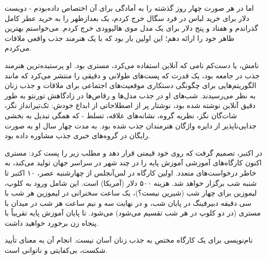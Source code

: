 اما در هر صورت چهار روز گذشته را به آمادگی برای آن اختصاص داده‌بودم - دویست دلار برای خرید لباس در فرد سگال خرج کردم، یک بعدازظهر را به خرید عطر کامل گذراندم و هفتاد و پنج دلار برای یک مدل موی هالیوودی خرج کردم. می‌خواستم بهترین ظاهر خود را ارائه دهم؛ این اولین بار بود که با یک هنرمند جذب واقعی ملاقات می‌کردم.

نامش، یا دست‌کم نامی که آنلاین استفاده می‌کرد، مستری بود. او پرستیده‌ترین هنرمند جذب در جامعه بود، یک قدرت که پست‌های طولانی و دقیقی را منتشر می‌کرد که مانند الگوریتم‌هایی برای چگونگی دستکاری موقعیت‌های اجتماعی برای ملاقات و جذب زنان به نظر می‌رسیدند. شب‌های او در جذب مدل‌ها و رقاص‌ها در زادگاهش تورنتو به طور دقیق آنلاین نوشته شده بود، نوشتار پر از اصطلاحاتی از ابداع خودش: تک‌تیرانداز نگز، شات‌گان نگز، نظریه گروه، نشانه‌های علاقه، تسلط - که همگی تبدیل به بخشی جدایی‌ناپذیر از دایره واژگان هنرمندان جذب شده بود. به مدت چهار سال او به صورت رایگان در گروه‌های خبری جذب مشاوره داده بود.

در اکتبر، تصمیم گرفت که روی خود قیمتی قرار دهد و مطلب زیر را پست کرد:
مستری اکنون کارگاه‌های آموزشی آموزش پایه را در چند شهر در سراسر جهان تولید می‌کند، به خاطر درخواست‌های متعدد. اولین کارگاه در لس‌آنجلس از چهارشنبه عصر، ۱۰ اکتبر تا شنبه شب برگزار خواهد شد. هزینه ۵۰۰ دلار (آمریکا) است. این شامل ورود به کلوپ، لیموزین برای چهار شب (شیرین نیست؟)، یک ساعت سخنرانی در لیموزین هر شب با سی دقیقه دبیرفینگ در پایان شب، و در نهایت سه و نیم ساعت هر شب در میدان با مستری (در دو کلوپ در هر شب تقسیم می‌شود) می‌شود. تا پایان آموزش پایه تقریباً با پنجاه زن برخورد خواهید داشت.

نام‌نویسی برای یک کارگاه مختص به جذب زنان آسان نیست. انجام آن به معنای تأیید شکست، بی‌کفایتی و ناتوانی است.